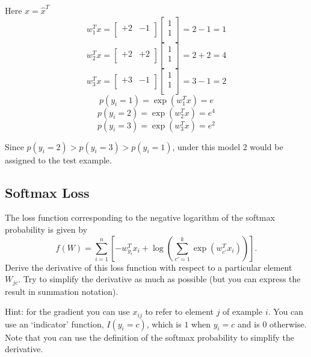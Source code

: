 \documentclass{article}
\begin{document}

Here $x=\hat{x}^T$
\[
w_1^Tx = \begin{bmatrix} +2 & -1 \\\end{bmatrix} \begin{bmatrix} 1 \\ 1 \\\end{bmatrix} = 2-1 = 1
\]
\[
w_2^Tx = \begin{bmatrix} +2 & +2 \\\end{bmatrix} \begin{bmatrix} 1 \\ 1 \\\end{bmatrix} = 2+2 = 4
\]
\[
w_3^Tx = \begin{bmatrix} +3 & -1 \\\end{bmatrix} \begin{bmatrix} 1 \\ 1 \\\end{bmatrix} = 3-1 = 2
\]
\[
p(y_i=1) = \exp(w_1^Tx) = e
\]
\[
p(y_i=2) = \exp(w_2^Tx) = e^4
\]
\[
p(y_i=3) = \exp(w_3^Tx) = e^2
\]

Since $p(y_i=2) > p(y_i=3) > p(y_i=1)$, under this model 2 would be assigned to the test example.

\subsection{Softmax Loss}

The loss function corresponding to the negative logarithm of the softmax probability is given by
\[
f(W) = \sum_{i=1}^n \left[-w_{y_i}^Tx_i + \log\left(\sum_{c' = 1}^k \exp(w_{c'}^Tx_i)\right)\right].
\]
Derive the derivative of this loss function with respect to a particular element $W_{jc}$. Try to simplify the derivative as much as possible (but you can express the result in summation notation).

Hint: for the gradient you can use $x_{ij}$ to refer to element $j$ of example $i$. You can use an `indicator' function, $I(y_i = c)$, which is $1$ when $y_i = c$ and is $0$ otherwise. Note that you can use the definition of the softmax probability to simplify the derivative.
\end{document}
